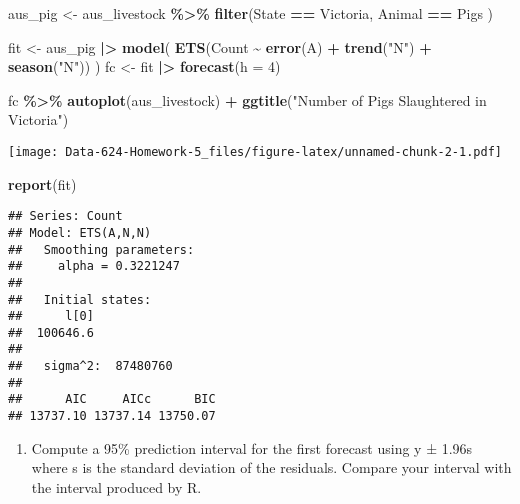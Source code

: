\documentclass[
]{article}
\newenvironment{Shaded}{\begin{snugshade}}{\end{snugshade}}
\newcommand{\AttributeTok}[1]{\textcolor[rgb]{0.13,0.29,0.53}{#1}}
\newcommand{\DecValTok}[1]{\textcolor[rgb]{0.00,0.00,0.81}{#1}}
\newcommand{\FunctionTok}[1]{\textcolor[rgb]{0.13,0.29,0.53}{\textbf{#1}}}
\newcommand{\NormalTok}[1]{#1}
\newcommand{\OtherTok}[1]{\textcolor[rgb]{0.56,0.35,0.01}{#1}}
\newcommand{\SpecialCharTok}[1]{\textcolor[rgb]{0.81,0.36,0.00}{\textbf{#1}}}
\newcommand{\StringTok}[1]{\textcolor[rgb]{0.31,0.60,0.02}{#1}}
\providecommand{\tightlist}{%
  \setlength{\itemsep}{0pt}\setlength{\parskip}{0pt}}
\begin{document}
\begin{Shaded}
\begin{Highlighting}[]
\NormalTok{aus\_pig }\OtherTok{\textless{}{-}}\NormalTok{ aus\_livestock }\SpecialCharTok{\%\textgreater{}\%} \FunctionTok{filter}\NormalTok{(State }\SpecialCharTok{==} \StringTok{\textquotesingle{}Victoria\textquotesingle{}}\NormalTok{,}
\NormalTok{                                    Animal }\SpecialCharTok{==} \StringTok{\textquotesingle{}Pigs\textquotesingle{}}\NormalTok{ )}

\NormalTok{fit }\OtherTok{\textless{}{-}}\NormalTok{ aus\_pig }\SpecialCharTok{|\textgreater{}} \FunctionTok{model}\NormalTok{(}
  \FunctionTok{ETS}\NormalTok{(Count }\SpecialCharTok{\textasciitilde{}} \FunctionTok{error}\NormalTok{(}\StringTok{\textquotesingle{}A\textquotesingle{}}\NormalTok{) }\SpecialCharTok{+} \FunctionTok{trend}\NormalTok{(}\StringTok{"N"}\NormalTok{) }\SpecialCharTok{+} \FunctionTok{season}\NormalTok{(}\StringTok{"N"}\NormalTok{))}
\NormalTok{)  }
\NormalTok{fc }\OtherTok{\textless{}{-}}\NormalTok{ fit }\SpecialCharTok{|\textgreater{}} \FunctionTok{forecast}\NormalTok{(}\AttributeTok{h =} \DecValTok{4}\NormalTok{)}

\NormalTok{fc }\SpecialCharTok{\%\textgreater{}\%}
  \FunctionTok{autoplot}\NormalTok{(aus\_livestock) }\SpecialCharTok{+}
  \FunctionTok{ggtitle}\NormalTok{(}\StringTok{"Number of Pigs Slaughtered in Victoria"}\NormalTok{)}
\end{Highlighting}
\end{Shaded}

\texttt{[image: Data-624-Homework-5\_files/figure-latex/unnamed-chunk-2-1.pdf]}

\begin{Shaded}
\begin{Highlighting}[]
\FunctionTok{report}\NormalTok{(fit)}
\end{Highlighting}
\end{Shaded}

\begin{verbatim}
## Series: Count 
## Model: ETS(A,N,N) 
##   Smoothing parameters:
##     alpha = 0.3221247 
## 
##   Initial states:
##      l[0]
##  100646.6
## 
##   sigma^2:  87480760
## 
##      AIC     AICc      BIC 
## 13737.10 13737.14 13750.07
\end{verbatim}

\begin{enumerate}
\def\labelenumi{\alph{enumi}.}
\setcounter{enumi}{1}
\tightlist
\item
  Compute a 95\% prediction interval for the first forecast using y ±
  1.96s where s is the standard deviation of the residuals. Compare your
  interval with the interval produced by R.
\end{enumerate}
\end{document}
